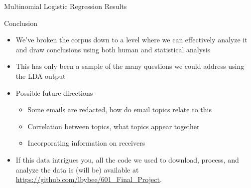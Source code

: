 \documentclass[handout,13pt]{beamer}
\begin{document}
\begin{frame}{Multinomial Logistic Regression Results}
\begin{table}[h]
\centering
\label{multinomial_results}
\end{table}
\end{frame}


\begin{frame}{Conclusion}
\begin{itemize}
\item We've broken the corpus down to a level where we can effectively analyze it and draw conclusions using both human and statistical analysis
\item This has only been a sample of the many questions we could address using the LDA output
\item Possible future directions
  \begin{itemize}
  \item Some emails are redacted, how do email topics relate to this
  \item Correlation between topics, what topics appear together
  \item Incorporating information on receivers 
  \end{itemize}
\item If this data intrigues you, all the code we used to download, process, and analyze the data is (will be) available at \url{https://github.com/lbybee/601_Final_Project}.
\end{itemize}
\end{frame}
\end{document}
